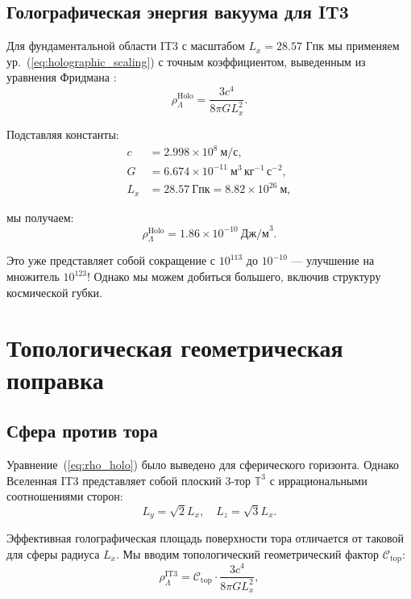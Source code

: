 \documentclass[12pt,a4paper]{article}
\begin{document}
\subsection{Голографическая энергия вакуума для IT3}

Для фундаментальной области IT3 с масштабом $L_x = 28.57$ Гпк мы применяем ур.~(\ref{eq:holographic_scaling}) с точным коэффициентом, выведенным из уравнения Фридмана \citep{Cohen1999}:
\begin{equation}
\rho_{\Lambda}^{\mathrm{Holo}} = \frac{3 c^4}{8 \pi G L_x^2}.
\label{eq:rho_holo}
\end{equation}

Подставляя константы:
\begin{align}
c &= 2.998 \times 10^8~\text{м/с}, \\
G &= 6.674 \times 10^{-11}~\text{м}^3\,\text{кг}^{-1}\,\text{с}^{-2}, \\
L_x &= 28.57~\text{Гпк} = 8.82 \times 10^{26}~\text{м},
\end{align}

мы получаем:
\begin{equation}
\rho_{\Lambda}^{\mathrm{Holo}} = 1.86 \times 10^{-10}~\text{Дж/м}^3.
\end{equation}

Это уже представляет собой сокращение с $10^{113}$ до $10^{-10}$ — улучшение на множитель $10^{123}$! Однако мы можем добиться большего, включив структуру космической губки.

\section{Топологическая геометрическая поправка}

\subsection{Сфера против тора}

Уравнение~(\ref{eq:rho_holo}) было выведено для сферического горизонта. Однако Вселенная IT3 представляет собой плоский 3-тор $\mathbb{T}^3$ с иррациональными соотношениями сторон:
\begin{equation}
L_y = \sqrt{2} L_x, \quad L_z = \sqrt{3} L_x.
\end{equation}

Эффективная голографическая площадь поверхности тора отличается от таковой для сферы радиуса $L_x$. Мы вводим топологический геометрический фактор $\mathcal{C}_{\mathrm{top}}$:
\begin{equation}
\rho_{\Lambda}^{\mathrm{IT3}} = \mathcal{C}_{\mathrm{top}} \cdot \frac{3 c^4}{8 \pi G L_x^2},
\end{equation}
\end{document}

